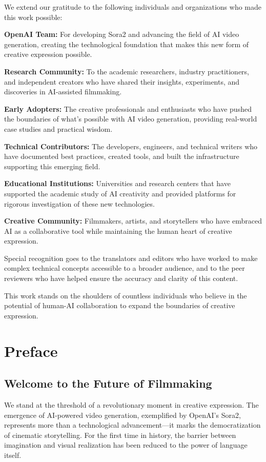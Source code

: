\documentclass[11pt,letterpaper]{book}
\begin{document}
We extend our gratitude to the following individuals and organizations who made this work possible:

\textbf{OpenAI Team:} For developing Sora2 and advancing the field of AI video generation, creating the technological foundation that makes this new form of creative expression possible.

\textbf{Research Community:} To the academic researchers, industry practitioners, and independent creators who have shared their insights, experiments, and discoveries in AI-assisted filmmaking.

\textbf{Early Adopters:} The creative professionals and enthusiasts who have pushed the boundaries of what's possible with AI video generation, providing real-world case studies and practical wisdom.

\textbf{Technical Contributors:} The developers, engineers, and technical writers who have documented best practices, created tools, and built the infrastructure supporting this emerging field.

\textbf{Educational Institutions:} Universities and research centers that have supported the academic study of AI creativity and provided platforms for rigorous investigation of these new technologies.

\textbf{Creative Community:} Filmmakers, artists, and storytellers who have embraced AI as a collaborative tool while maintaining the human heart of creative expression.

Special recognition goes to the translators and editors who have worked to make complex technical concepts accessible to a broader audience, and to the peer reviewers who have helped ensure the accuracy and clarity of this content.

This work stands on the shoulders of countless individuals who believe in the potential of human-AI collaboration to expand the boundaries of creative expression.

\chapter*{Preface}

\section*{Welcome to the Future of Filmmaking}

We stand at the threshold of a revolutionary moment in creative expression. The emergence of AI-powered video generation, exemplified by OpenAI's Sora2, represents more than a technological advancement—it marks the democratization of cinematic storytelling. For the first time in history, the barrier between imagination and visual realization has been reduced to the power of language itself.
\end{document}
